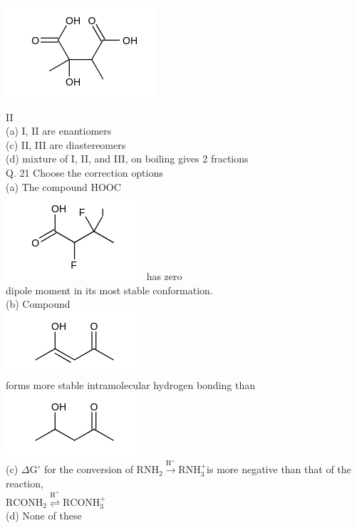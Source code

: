 \documentclass[10pt]{article}
\begin{document}
\includegraphics{smile-e97b0cb7df26fe12fefb1be3c419bbd1a38e115a}

II\\
(a) I, II are enantiomers\\
(c) II, III are diastereomers\\
(d) mixture of I, II, and III, on boiling gives 2 fractions\\
Q. 21 Choose the correction options\\
(a) The compound HOOC\\
\includegraphics{smile-594be88fe22e724d41a8d7b355059f906676bb5f} has zero\\
dipole moment in its most stable conformation.\\
(b) Compound\\
\includegraphics{smile-9228c1bbf2473ab7c9f915ec2b76f1849791c00d}\\
forms more stable intramolecular hydrogen bonding than\\
\includegraphics{smile-ebe110e6d61770ea2b0537c5bc4d59923c9bc80a}\\
(c) $\Delta \mathrm{G}^{\circ}$ for the conversion of $\mathrm{RNH}_{2} \xrightarrow{\mathrm{H}^{+}} \mathrm{RNH}_{3}^{+}$is more negative than that of the reaction,\\
$\mathrm{RCONH}_{2} \stackrel{\mathrm{H}^{+}}{\rightleftharpoons} \mathrm{RCONH}_{3}^{+}$\\
(d) None of these
\end{document}
